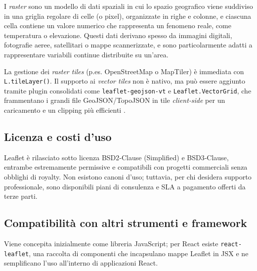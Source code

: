 I \textit{raster} sono un modello di dati spaziali in cui lo spazio geografico viene
suddiviso in una griglia regolare di celle (o pixel), organizzate in righe e
colonne, e ciascuna cella contiene un valore numerico che rappresenta un fenomeno
reale, come temperatura o elevazione. Questi dati derivano spesso da immagini digitali,
fotografie aeree, satellitari o mappe scannerizzate, e sono particolarmente
adatti a rappresentare variabili continue distribuite su un'area. \cite{esri-raster-model,qgis-raster-data}

La gestione dei \emph{raster tiles} (p.es. OpenStreetMap o MapTiler) è immediata
con \texttt{L.tileLayer()}\cite{maptiler-raster}. Il supporto ai \emph{vector
tiles} non è nativo, ma può essere aggiunto tramite plugin consolidati come \texttt{leaflet-geojson-vt}
e \texttt{Leaflet.VectorGrid}, che frammentano i grandi file GeoJSON/TopoJSON in
tile \textit{client‑side} per un caricamento e un clipping più efficienti \cite{leaflet-geojson-vt,vectorgrid}.

\subsection{Licenza e costi d'uso}
Leaflet è rilasciato sotto licenza BSD2‑Clause (Simplified) e BSD3‑Clause,
entrambe estremamente permissive e compatibili con progetti commerciali senza
obblighi di royalty. Non esistono canoni d'uso; tuttavia, per chi desidera supporto
professionale, sono disponibili piani di consulenza e SLA a pagamento offerti da
terze parti. \cite{leaflet-doc, leaflet-license}

\subsection{Compatibilità con altri strumenti e framework}
Viene concepita inizialmente come libreria JavaScript; per React esiste \texttt{react-leaflet},
una raccolta di componenti che incapsulano mappe Leaflet in JSX e ne semplificano
l'uso all'interno di applicazioni React. \cite{react-leaflet}

\newpage